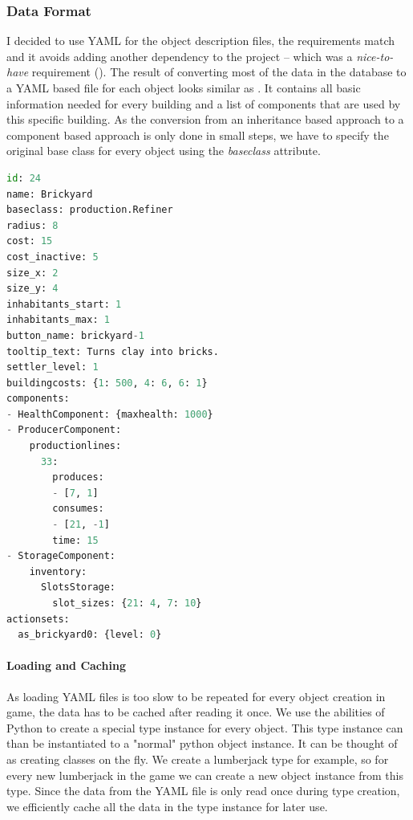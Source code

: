 \subsubsection{Data Format}
I decided to use YAML for the object description files, the requirements match and it avoids adding another
dependency to the project -- which was a \textit{nice-to-have} requirement (). The result of converting most of the data in the database to a YAML based file for each
object looks similar as . It contains all basic information needed for every building and a list of components
that are used by this specific building. As the conversion from an inheritance based approach to a component based
approach is only done in small steps, we have to specify the original base class for every object using the
\textit{baseclass} attribute.

\begin{lstlisting}[language=python,caption=A basic (shortened) building definition in YAML for \UH{}, label=uhyaml]
id: 24
name: Brickyard
baseclass: production.Refiner
radius: 8
cost: 15
cost_inactive: 5
size_x: 2
size_y: 4
inhabitants_start: 1
inhabitants_max: 1
button_name: brickyard-1
tooltip_text: Turns clay into bricks.
settler_level: 1
buildingcosts: {1: 500, 4: 6, 6: 1}
components:
- HealthComponent: {maxhealth: 1000}
- ProducerComponent:
    productionlines:
      33:
        produces:
        - [7, 1]
        consumes:
        - [21, -1]
        time: 15
- StorageComponent:
    inventory:
      SlotsStorage:
        slot_sizes: {21: 4, 7: 10}
actionsets:
  as_brickyard0: {level: 0}
\end{lstlisting}

\paragraph{Loading and Caching}
As loading YAML files is too slow to be repeated for every object creation in game, the data has to be cached after
reading it once. We use the abilities of Python to create a special type instance for every object. This type instance can
than be instantiated to a "normal" python object instance. It can be thought of as creating classes on the fly. We
create a lumberjack type for example, so for every new lumberjack in the game we can create a new object instance from
this type.
Since the data from the YAML file is only read once during type creation, we efficiently cache all the data in the
type instance for later use.

